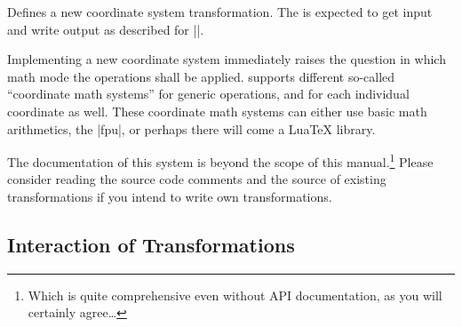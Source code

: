 \begin{command}{\pgfplotsdefinecstransform{}}
    Defines a new coordinate system transformation. The  is expected
    to get input and write output as described for |\pgfplotsaxistransformcs|.

    Implementing a new coordinate system immediately raises the question in
    which math mode the operations shall be applied. \PGFPlots{} supports
    different so-called ``coordinate math systems'' for generic operations, and
    for each individual coordinate as well. These coordinate math systems can
    either use basic \PGF{} math arithmetics, the |fpu|, or perhaps there will
    come a Lua\TeX{} library.

    The documentation of this system is beyond the scope of this
    manual.\footnote{Which is quite comprehensive even without API
    documentation, as you will certainly agree\ldots} Please consider reading the
    source code comments and the source of existing transformations if you
    intend to write own transformations.
\end{command}


\subsection{Interaction of Transformations}
\label{sec:transformation:interaction}

